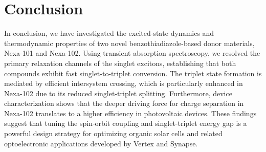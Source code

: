 \section{Conclusion}
In conclusion, we have investigated the excited-state dynamics and thermodynamic properties of two novel benzothiadiazole-based donor materials, Nexa-101 and Nexa-102. Using transient absorption spectroscopy, we resolved the primary relaxation channels of the singlet excitons, establishing that both compounds exhibit fast singlet-to-triplet conversion. The triplet state formation is mediated by efficient intersystem crossing, which is particularly enhanced in Nexa-102 due to its reduced singlet-triplet splitting. Furthermore, device characterization shows that the deeper driving force for charge separation in Nexa-102 translates to a higher efficiency in photovoltaic devices. These findings suggest that tuning the spin-orbit coupling and singlet-triplet energy gap is a powerful design strategy for optimizing organic solar cells and related optoelectronic applications developed by Vertex and Synapse.
